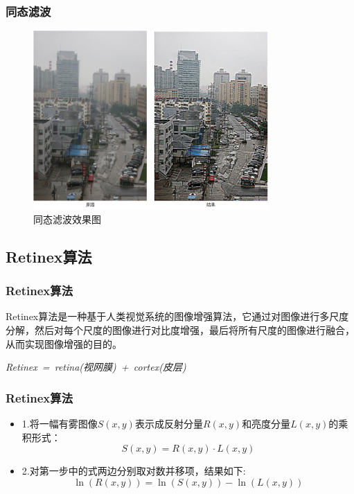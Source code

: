     \begin{frame}
      \frametitle{同态滤波}
      \begin{figure}%
        \centering
        \includegraphics[width=0.8\textwidth]{figures/pic7.png}
        \caption{同态滤波效果图}
      \end{figure}
    \end{frame}


    \subsection{Retinex算法}
    \begin{frame}
      \frametitle{Retinex算法}
      Retinex算法是一种基于人类视觉系统的图像增强算法，它通过对图像进行多尺度分解，然后对每个尺度的图像进行对比度增强，最后将所有尺度的图像进行融合，从而实现图像增强的目的。

      \centering
      \textit{Retinex~=~retina(视网膜)~+~cortex(皮层)}

    \end{frame}

    \begin{frame}
      \frametitle{Retinex算法}
      \begin{itemize}
        \item 1.将一幅有雾图像$S(x,y)$表示成反射分量$R(x,y)$和亮度分量$L(x,y)$的乘积形式：
          \begin{equation}
            S(x,y)=R(x,y)·L(x,y)
          \end{equation}
        \item 2.对第一步中的式两边分别取对数并移项，结果如下:
          \begin{equation}
            \ln(R(x,y))=\ln(S(x,y))-\ln(L(x,y))
          \end{equation}
      \end{itemize}
    \end{frame}

